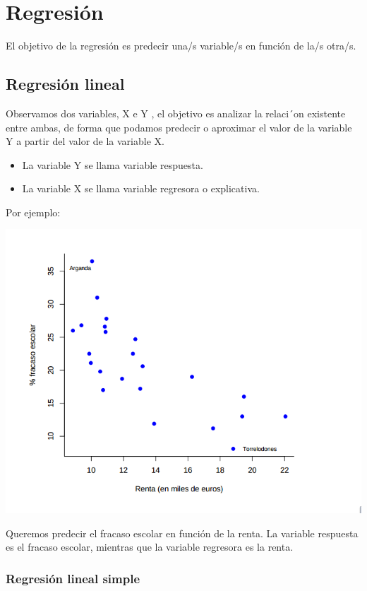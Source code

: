
\chapter{Regresión}
El objetivo de la regresión es predecir una/s variable/s en función de la/s otra/s.


\section{Regresión lineal}

Observamos dos variables, X e Y , el objetivo es analizar la relaci´on existente entre ambas, de forma que podamos predecir o aproximar el valor de la variable Y a partir del valor de la variable X.

\begin{itemize}
\item La variable Y se llama variable respuesta.
\item La variable X se llama variable regresora o explicativa.
\end{itemize}

Por ejemplo:
\begin{center}
\includegraphics[scale=0.5]{img/RentaVsFracaso.png}
\end{center}

Queremos predecir el fracaso escolar en función de la renta. La variable respuesta es el fracaso escolar, mientras que la variable regresora es la renta. 

\subsection{Regresión lineal simple}

